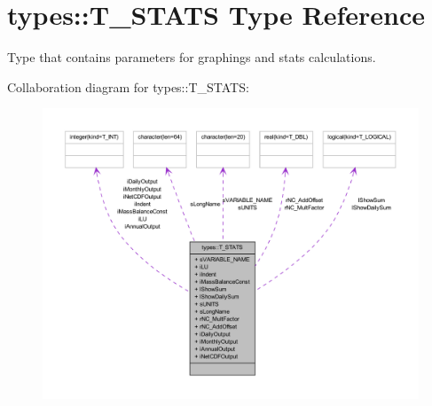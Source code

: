 \hypertarget{typetypes_1_1_t___s_t_a_t_s}{
\section{types::T\_\-STATS Type Reference}
\label{typetypes_1_1_t___s_t_a_t_s}
}


Type that contains parameters for graphings and stats calculations.  




Collaboration diagram for types::T\_\-STATS:\nopagebreak
\begin{figure}[H]
\begin{center}
\leavevmode
\includegraphics[width=400pt]{typetypes_1_1_t___s_t_a_t_s__coll__graph}
\end{center}
\end{figure}
